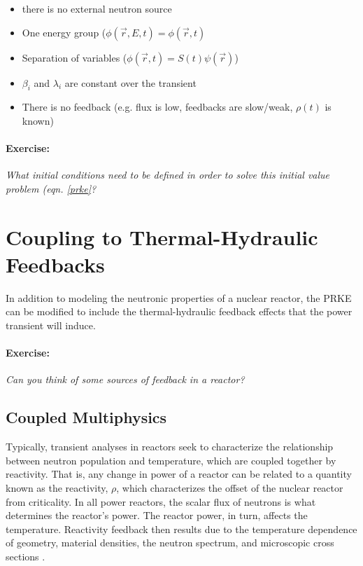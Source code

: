 \documentclass[12pt]{article}
\begin{document}
\begin{itemize}
\item there is no external neutron source
\item One energy group ($\phi(\vec{r},E,t) = \phi(\vec{r},t)$
\item Separation of variables ($\phi(\vec{r},t) = S(t)\psi(\vec{r})$)
\item $\beta_i$ and $\lambda_i$ are constant over the transient
\item There is no feedback (e.g. flux is low, feedbacks are slow/weak, $\rho(t)$ is known)
\end{itemize}


\paragraph{Exercise:}
\emph{What initial conditions need to be defined in order to solve this initial 
value problem (eqn. \eqref{prke}?}
\section{Coupling to Thermal-Hydraulic Feedbacks}

In addition to modeling
the neutronic properties of a nuclear reactor, the PRKE can be modified to
include the thermal-hydraulic feedback effects that the power transient will
induce.

\paragraph{Exercise:} \emph{Can you think of some sources of feedback in a 
reactor?}

\subsection{Coupled Multiphysics}

Typically, transient analyses in reactors seek to characterize the relationship
between neutron population and temperature, which are coupled together by
reactivity.  That is, any change in power of a reactor can be related to a
quantity known as the reactivity, $\rho$, which characterizes the offset of the
nuclear reactor from criticality. In all power reactors,  the scalar flux of
neutrons is what determines the reactor's power. The reactor power, in turn,
affects the temperature. Reactivity feedback then results due to the temperature
dependence of geometry, material densities, the neutron spectrum, and
microscopic cross sections \cite{bell_nuclear_1970}.
\end{document}
